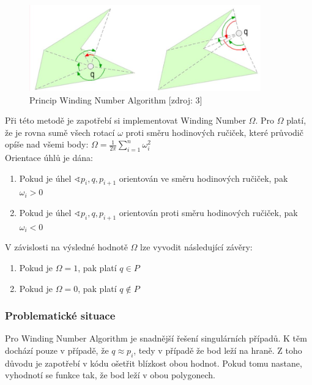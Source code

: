 \documentclass[a4paper, 12pt]{article}
\begin{document}
\begin{figure}[h]
	\centering
	\includegraphics[width=10cm]{winding.jpg}
	\caption{Princip Winding Number Algorithm [zdroj: 3]}
\end{figure}

Při této metodě je zapotřebí si implementovat Winding Number $\Omega$. Pro $\Omega$ platí, že je rovna sumě všech rotací $\omega$ proti směru hodinových ručiček, které průvodič opíše nad všemi body: $ \Omega = \frac{1}{2\pi} \sum_{i=1}^n \omega_i^2$
\\
Orientace úhlů je dána:
\begin{enumerate}
\item Pokud je úhel $\sphericalangle p_i, q, p_{i+1}$ orientován ve směru hodinových ručiček, pak $\omega_i > 0$
\item Pokud je úhel $\sphericalangle p_i, q, p_{i+1}$ orientován proti směru hodinových ručiček, pak $\omega_i < 0$
\end{enumerate}


V závislosti na výsledné hodnotě $\Omega$ lze vyvodit následující závěry:
\begin{enumerate}
\item Pokud je $\Omega = 1$, pak platí $q \in P$ 
\item Pokud je $\Omega = 0$, pak platí $q { \not \in } P$
\end{enumerate}

\subsubsection{Problematické situace}
Pro Winding Number Algorithm je snadnější řešení singulárních případů. K těm dochází pouze v případě, že $q \approx p_i$, tedy v případě že bod leží na hraně. Z toho důvodu je zapotřebí v kódu ošetřit blízkost obou hodnot. Pokud tomu nastane, vyhodnotí se funkce tak, že bod leží v obou polygonech.
\end{document}
